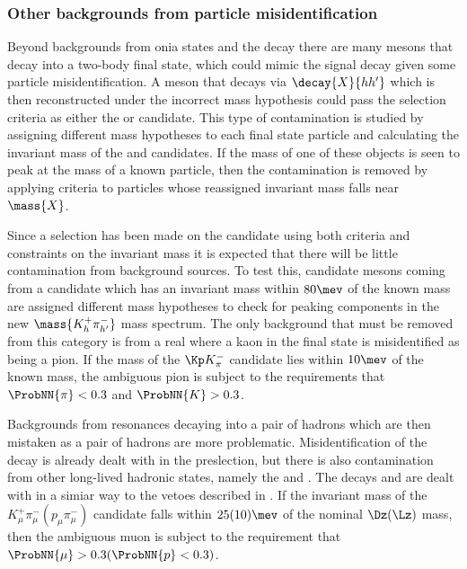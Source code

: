 \subsubsection{Other backgrounds from particle misidentification}
\label{sec:db:backgrounds:misid}

Beyond backgrounds from onia states and the \KS decay there are many mesons that decay into a
two-body final state, which could mimic the signal decay given some particle misidentification.
A meson that decays via $\decay{X}{hh^\prime}$ which is then reconstructed
under the incorrect mass hypothesis could pass the selection criteria as either the \db or \Kstarz
candidate.
This type of contamination is studied by assigning different mass hypotheses to each final state
particle and calculating the invariant mass of the \mumu and \kpi candidates.
If the mass of one of these objects is seen to peak at the mass of a known particle, then the
contamination is removed  by applying \pid criteria to particles whose reassigned invariant mass
falls near $\mass{X}$.

Since a selection has been made on the \decay{\Kstarz}{\kpi} candidate using both \pid criteria and
constraints on the \kpi invariant mass it is expected that there will be little contamination
from background sources.
To test this, candidate \Kstarz mesons coming from a \Bd candidate which has an invariant mass
within $80\mev$ of the known \Bd mass are assigned different mass hypotheses to check for peaking
components in the new $\mass{K_{h}^+\pi_{h^\prime}^-}$ mass spectrum.
The only background that must be removed from this category is from a real \decay{\phi}{\kk}
where a kaon in the final state is misidentified as being a pion.
If the mass of the $\Kp K^-_\pi$ candidate lies within $10\mev$ of the known \phii mass, the
ambiguous pion is subject to the requirements that
$\ProbNN{\pi}<0.3$ and $\ProbNN{K}>0.3$.

Backgrounds from resonances decaying into a pair of hadrons which are then mistaken as a pair of
hadrons are more problematic.
Misidentification of the decay \decay{\KS}{\pipi} is already dealt with in the preslection, but
there is also contamination from other long-lived hadronic states, namely the \Dz and \Lz.
The decays \decay{\Dz}{\kpi} and  are dealt with in a simiar way to the vetoes
described in .
If the invariant mass of the $K^+_\mu\pi^-_\mu(p_\mu\pi^-_\mu)$ candidate falls within $25(10)\mev$
of the nominal $\Dz(\Lz)$ mass, then the ambiguous muon is subject to the requirement that
$\ProbNN{\mu}>0.3(\ProbNN{p}<0.3)$.


